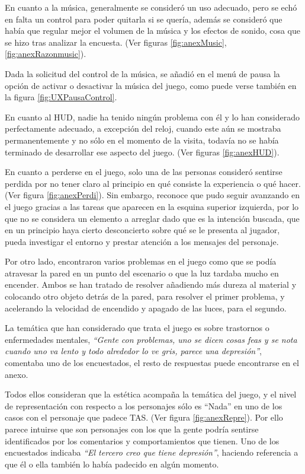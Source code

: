 \documentclass[12pt, a4paper,twoside,titlepage]{book}
\begin{document}
En cuanto a la música, generalmente se consideró un uso adecuado, pero se echó en falta un control para poder quitarla si se quería, además se consideró que había que regular mejor el volumen de la música y los efectos de sonido, cosa que se hizo tras analizar la encuesta. (Ver figuras \ref{fig:anexMusic}, \ref{fig:anexRazonmusic}). 

Dada la solicitud del control de la música, se añadió en el menú de pausa la opción de activar o desactivar la música del juego, como puede verse también en la figura \ref{fig:UXPausaControl}.

En cuanto al HUD, nadie ha tenido ningún problema con él y lo han considerado perfectamente adecuado, a excepción del reloj, cuando este aún se mostraba permanentemente y no sólo en el momento de la visita, todavía no se había terminado de desarrollar ese aspecto del juego. (Ver figuras \ref{fig:anexHUD}). 

En cuanto a perderse en el juego, solo una de las personas consideró sentirse perdida por no tener claro al principio en qué consiste la experiencia o qué hacer. (Ver figura \ref{fig:anexPerdi}). Sin embargo, reconoce que pudo seguir avanzando en el juego gracias a las tareas que aparecen en la esquina superior izquierda, por lo que no se considera un elemento a arreglar dado que es la intención buscada, que en un principio haya cierto desconcierto sobre qué se le presenta al jugador, pueda investigar el entorno y prestar atención a los mensajes del personaje.

Por otro lado, encontraron varios problemas en el juego como que se podía atravesar la pared en un punto del escenario o que la luz tardaba mucho en encender. Ambos se han tratado de resolver añadiendo más dureza al material y colocando otro objeto detrás de la pared, para resolver el primer problema, y acelerando la velocidad de encendido y apagado de las luces, para el segundo. 

La temática que han considerado que trata el juego es sobre trastornos o enfermedades mentales, \textit{``Gente con problemas, uno se dicen cosas feas y se nota cuando uno va lento y todo alrededor lo ve gris, parece una depresión''}, comentaba uno de los encuestados, el resto de respuestas puede encontrarse en el anexo. 

Todos ellos consideran que la estética acompaña la temática del juego, y el nivel de representación con respecto a los personajes sólo es ``Nada'' en uno de los casos con el personaje que padece TAS. (Ver figura \ref{fig:anexRepre}). Por ello parece intuirse que son personajes con los que la gente podría sentirse identificados por los comentarios y comportamientos que tienen. Uno de los encuestados indicaba \textit{``El tercero creo que tiene depresión''}, haciendo referencia a que él o ella también lo había padecido en algún momento. 
\end{document}
